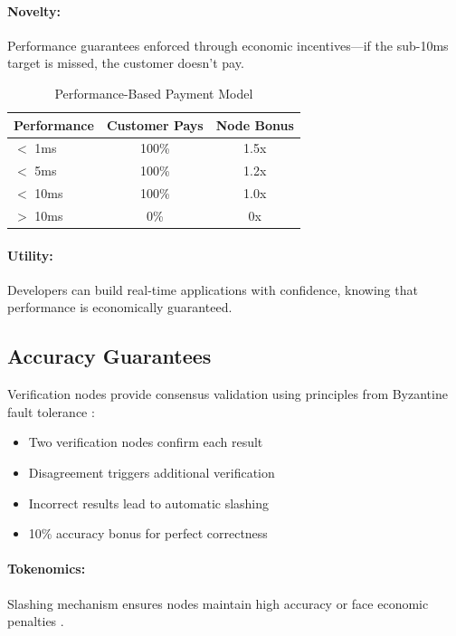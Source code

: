 \documentclass[12pt,a4paper]{article}
\begin{document}
\paragraph{Novelty:} Performance guarantees enforced through economic incentives—if the sub-10ms target is missed, the customer doesn't pay.

\begin{table}[h]
\centering
\begin{tabular}{lcc}
\toprule
\textbf{Performance} & \textbf{Customer Pays} & \textbf{Node Bonus} \\
\midrule
$<$ 1ms & 100\% & 1.5x \\
$<$ 5ms & 100\% & 1.2x \\
$<$ 10ms & 100\% & 1.0x \\
$>$ 10ms & 0\% & 0x \\
\bottomrule
\end{tabular}
\caption{Performance-Based Payment Model}
\end{table}

\paragraph{Utility:} Developers can build real-time applications with confidence, knowing that performance is economically guaranteed.

\subsection{Accuracy Guarantees}

Verification nodes provide consensus validation using principles from Byzantine fault tolerance \cite{pbft1999, raft2014}:
\begin{itemize}
    \item Two verification nodes confirm each result
    \item Disagreement triggers additional verification
    \item Incorrect results lead to automatic slashing
    \item 10\% accuracy bonus for perfect correctness
\end{itemize}

\paragraph{Tokenomics:} Slashing mechanism ensures nodes maintain high accuracy or face economic penalties \cite{slashing2019, gametheory2020}.
\end{document}
